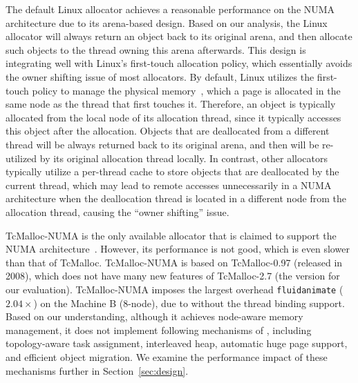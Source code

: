 The default Linux allocator achieves a reasonable performance on the NUMA architecture due to its arena-based design. Based on our analysis, the Linux allocator will always return an object back to its original arena, and then allocate such objects to the thread owning this arena afterwards. This design is integrating well with Linux's first-touch allocation policy, which essentially avoids the owner shifting issue of most allocators. By default, Linux utilizes the first-touch policy to manage the physical memory~\cite{Lameter:2013:NO:2508834.2513149}, which a page is allocated in the same node as the thread that first touches it. Therefore, an object is typically allocated from the local node of its allocation thread, since it typically accesses this object after the allocation. Objects that are deallocated from a different thread will be always returned back to its original arena, and then will be re-utilized by its original allocation thread locally. In contrast, other allocators typically utilize a per-thread cache to store objects that are deallocated by the current thread, which may lead to remote accesses unnecessarily in a NUMA architecture when the deallocation thread is located in a different node from the allocation thread, causing the ``owner shifting'' issue.  

 TcMalloc-NUMA is the only available allocator that is claimed to support the NUMA architecture~\cite{tcmallocnew}. However, its performance is not good, which is even slower than that of TcMalloc. TcMalloc-NUMA is based on TcMalloc-0.97 (released in 2008), which does not have many new features of TcMalloc-2.7 (the version for our evaluation). TcMalloc-NUMA imposes the largest overhead \texttt{fluidanimate} ($2.04\times$) on the Machine B (8-node), due to without the thread binding support.  Based on our understanding, although it achieves node-aware memory management, it does not implement following mechanisms of \NM{}, including topology-aware task assignment, interleaved heap, automatic huge page support, and efficient object migration. We examine the performance impact of these mechanisms further in Section~\ref{sec:design}.    
  



